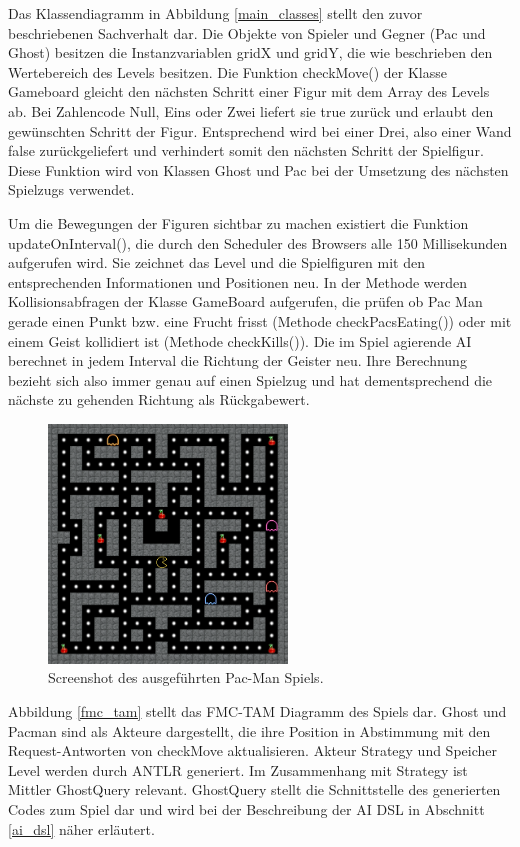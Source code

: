 \documentclass[conference]{IEEEtran}
\begin{document}
Das Klassendiagramm in Abbildung \ref{main_classes} stellt den zuvor beschriebenen Sachverhalt dar. Die Objekte von Spieler und Gegner (Pac und Ghost) besitzen die Instanzvariablen gridX und gridY, die wie beschrieben den Wertebereich des Levels besitzen. Die Funktion checkMove() der Klasse Gameboard gleicht den nächsten Schritt einer Figur mit dem Array des Levels ab. Bei Zahlencode Null, Eins oder Zwei liefert sie true zurück und erlaubt den gewünschten Schritt der Figur. Entsprechend wird bei einer Drei, also einer Wand false zurückgeliefert und verhindert somit den nächsten Schritt der Spielfigur. Diese Funktion wird von Klassen Ghost und Pac bei der Umsetzung des nächsten Spielzugs verwendet.

Um die Bewegungen der Figuren sichtbar zu machen existiert die Funktion updateOnInterval(), die durch den Scheduler des Browsers  alle 150 Millisekunden aufgerufen wird. Sie zeichnet das Level und die Spielfiguren mit den entsprechenden Informationen und Positionen neu. In der Methode werden Kollisionsabfragen der Klasse GameBoard aufgerufen, die prüfen ob Pac Man gerade einen Punkt bzw. eine Frucht frisst (Methode checkPacsEating()) oder mit einem Geist kollidiert ist (Methode checkKills()). Die im Spiel agierende AI berechnet in jedem Interval die Richtung der Geister neu. Ihre Berechnung bezieht sich also immer genau auf einen Spielzug und hat dementsprechend die nächste zu gehenden Richtung als Rückgabewert.

\begin{figure}[!t]
\centering
\includegraphics[width=2.5in]{screenshot.png}

\caption{Screenshot des ausgeführten Pac-Man Spiels.}
\label{pac_screen}
\end{figure}

Abbildung \ref{fmc_tam} stellt das FMC-TAM Diagramm des Spiels dar. Ghost und Pacman sind als Akteure dargestellt, die ihre Position in Abstimmung mit den Request-Antworten von checkMove aktualisieren. Akteur Strategy und Speicher Level werden durch ANTLR generiert. Im Zusammenhang mit Strategy ist Mittler GhostQuery relevant. GhostQuery stellt die Schnittstelle des generierten Codes zum Spiel dar und wird bei der Beschreibung der AI DSL in Abschnitt \ref{ai_dsl} näher erläutert.
\end{document}
